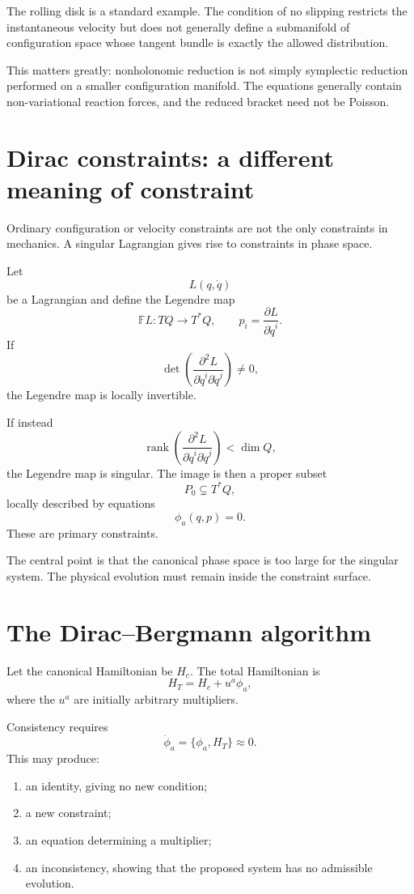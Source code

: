 The rolling disk is a standard example.  The condition of no slipping restricts
the instantaneous velocity but does not generally define a submanifold of
configuration space whose tangent bundle is exactly the allowed distribution.

This matters greatly: nonholonomic reduction is not simply symplectic
reduction performed on a smaller configuration manifold.  The equations
generally contain non-variational reaction forces, and the reduced bracket
need not be Poisson.

\section{Dirac constraints: a different meaning of constraint}

Ordinary configuration or velocity constraints are not the only constraints
in mechanics.  A singular Lagrangian gives rise to constraints in phase space.

Let
\[
        L(q,\dot q)
\]
be a Lagrangian and define the Legendre map
\[
        \mathbb FL:TQ\longrightarrow T^*Q,
        \qquad
        p_i=\frac{\partial L}{\partial\dot q^i}.
\]
If
\[
        \det\left(
        \frac{\partial^2L}{\partial\dot q^i\partial\dot q^j}
        \right)\neq0,
\]
the Legendre map is locally invertible.

If instead
\[
        \operatorname{rank}\left(
        \frac{\partial^2L}{\partial\dot q^i\partial\dot q^j}
        \right)<\dim Q,
\]
the Legendre map is singular.  The image is then a proper subset
\[
        P_0\subsetneq T^*Q,
\]
locally described by equations
\[
        \phi_a(q,p)=0.
\]
These are primary constraints.

The central point is that the canonical phase space is too large for the
singular system.  The physical evolution must remain inside the constraint
surface.

\section{The Dirac--Bergmann algorithm}

Let the canonical Hamiltonian be $H_c$.  The total Hamiltonian is
\[
        H_T=H_c+u^a\phi_a,
\]
where the $u^a$ are initially arbitrary multipliers.

Consistency requires
\[
        \dot\phi_a
        =
        \{\phi_a,H_T\}
        \approx0.
\]
This may produce:

\begin{enumerate}
\item an identity, giving no new condition;
\item a new constraint;
\item an equation determining a multiplier;
\item an inconsistency, showing that the proposed system has no admissible
      evolution.
\end{enumerate}

